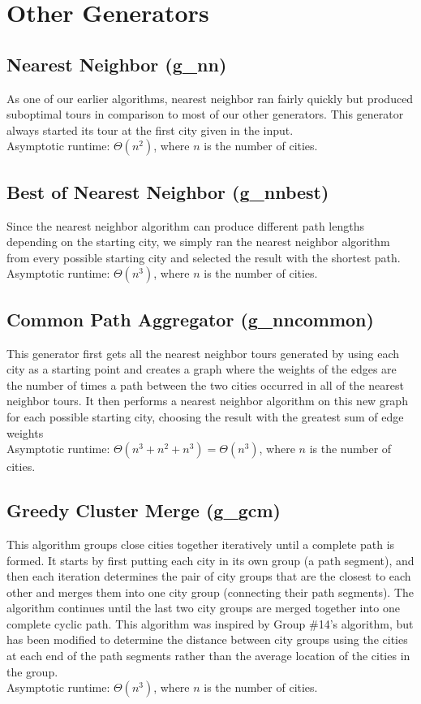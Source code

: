 \documentclass{article}
\begin{document}
\section*{Other Generators}

\subsection*{Nearest Neighbor (g\_nn)}

As one of our earlier algorithms, nearest neighbor ran fairly quickly but
produced suboptimal tours in comparison to most of our other generators. This
generator always started its tour at the first city given in the
input.\\Asymptotic runtime: $\Theta (n^2)$, where $n$ is the number of cities.

\subsection*{Best of Nearest Neighbor (g\_nnbest)}

Since the nearest neighbor algorithm can produce different path lengths
depending on the starting city, we simply ran the nearest neighbor algorithm
from every possible starting city and selected the result with the shortest
path.\\Asymptotic runtime: $\Theta (n^3)$, where $n$ is the number of cities.

\subsection*{Common Path Aggregator (g\_nncommon)}

This generator first gets all the nearest neighbor tours generated by using
each city as a starting point and creates a graph where the weights of the
edges are the number of times a path between the two cities occurred in all of
the nearest neighbor tours. It then performs a nearest neighbor algorithm on
this new graph for each possible starting city, choosing the result with the
greatest sum of edge weights \\Asymptotic runtime: $\Theta (n^3 + n^2 + n^3) =
\Theta (n^3)$, where $n$ is the number of cities.

\subsection*{Greedy Cluster Merge (g\_gcm)}

This algorithm groups close cities together iteratively until a complete path
is formed. It starts by first putting each city in its own group (a path
segment), and then each iteration determines the pair of city groups that are
the closest to each other and merges them into one city group (connecting their
path segments). The algorithm continues until the last two city groups are
merged together into one complete cyclic path. This algorithm was inspired by
Group \#14's algorithm, but has been modified to determine the distance between
city groups using the cities at each end of the path segments rather than the
average location of the cities in the group.\\Asymptotic runtime: $\Theta
(n^3)$, where $n$ is the number of cities.
\end{document}
